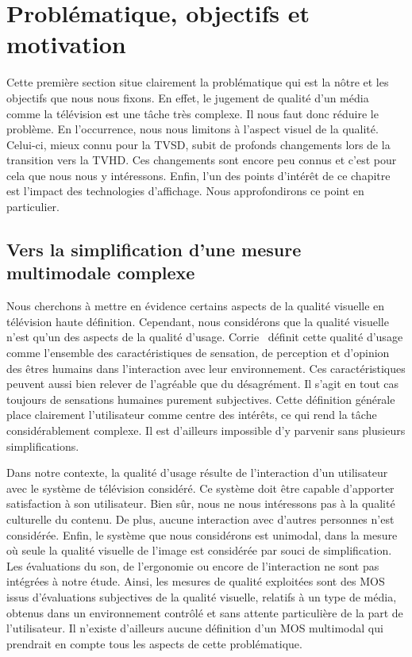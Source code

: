\section{Problématique, objectifs et motivation}
Cette première section situe clairement la problématique qui est la nôtre et les objectifs que nous nous fixons. En effet, le jugement de qualité d'un média comme la télévision est une tâche très complexe. Il nous faut donc réduire le problème. En l'occurrence, nous nous limitons à l'aspect visuel de la qualité. Celui-ci, mieux connu pour la TVSD, subit de profonds changements lors de la transition vers la TVHD. Ces changements sont encore peu connus et c'est pour cela que nous nous y intéressons. Enfin, l'un des points d'intérêt de ce chapitre est l'impact des technologies d'affichage. Nous approfondirons ce point en particulier.


\subsection{Vers la simplification d'une mesure multimodale complexe}
Nous cherchons à mettre en évidence certains aspects de la qualité visuelle en télévision haute définition. Cependant, nous considérons que la qualité visuelle n'est qu'un des aspects de la qualité d'usage. Corrie~\cite{corrie-wace2003} définit cette qualité d'usage comme l'ensemble des caractéristiques de sensation, de perception et d'opinion des êtres humains dans l'interaction avec leur environnement. Ces caractéristiques peuvent aussi bien relever de l'agréable que du désagrément. Il s'agit en tout cas toujours de sensations humaines purement subjectives. Cette définition générale place clairement l'utilisateur comme centre des intérêts, ce qui rend la tâche considérablement complexe. Il est d'ailleurs impossible d'y parvenir sans plusieurs simplifications.

Dans notre contexte, la qualité d'usage résulte de l'interaction d'un utilisateur avec le système de télévision considéré. Ce système doit être capable d'apporter satisfaction à son utilisateur. Bien sûr, nous ne nous intéressons pas à la qualité culturelle du contenu. De plus, aucune interaction avec d'autres personnes n'est considérée. Enfin, le système que nous considérons est unimodal, dans la mesure où seule la qualité visuelle de l'image est considérée par souci de simplification. Les évaluations du son, de l'ergonomie ou encore de l'interaction ne sont pas intégrées à notre étude. Ainsi, les mesures de qualité exploitées sont des MOS issus d'évaluations subjectives de la qualité visuelle, relatifs à un type de média, obtenus dans un environnement contrôlé et sans attente particulière de la part de l'utilisateur. Il n'existe d'ailleurs aucune définition d'un MOS multimodal qui prendrait en compte tous les aspects de cette problématique.


